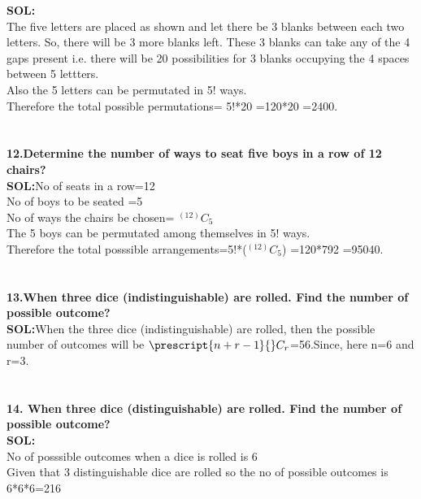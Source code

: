 \documentclass[8pt,a4paper]{article}
\newcommand\Mycomb[2][n]{\prescript{#1\mkern-0.5mu}{}C_{#2}}
\begin{document}
\textbf{SOL:}\\
The five letters are placed as shown and let there be 3 blanks between each two letters. So, there will be 3 more blanks left. These 3 blanks can take any of the 4 gaps present i.e. there will be 20 possibilities for 3 blanks occupying the 4 spaces between 5 lettters.\\Also the 5 letters can be permutated in 5!  ways.\\ Therefore the total possible permutations= 5!*20 =120*20 =2400.\\


\section{}

\textbf{12.Determine the number of ways to seat five boys in a row of 12 chairs?}\\

\textbf{SOL:}No of seats in a row=12\\
 No of boys to be seated =5\\
 No of ways the chairs be chosen= $^(12)C_5$\\
 The 5 boys can be permutated among themselves in 5! ways.\\
 Therefore the total posssible arrangements=5!*($^(12)C_5$)
                                           =120*792
                                           =95040.


\section{}

\textbf{13.When three dice (indistinguishable) are rolled. Find the number of possible outcome?}\\

\textbf{SOL:}When the three dice (indistinguishable) are rolled, then the possible number of outcomes will be
      $\Mycomb[n+r-1]{r}$=56.Since, here n=6 and r=3.\\


\section{}

\textbf{14. When three dice (distinguishable) are rolled. Find the number of possible outcome?}\\

\textbf{SOL:}\\No of posssible outcomes when a dice is rolled is 6\\ Given that 3 distinguishable dice are rolled so the no of possible outcomes is 6*6*6=216\\
\end{document}
